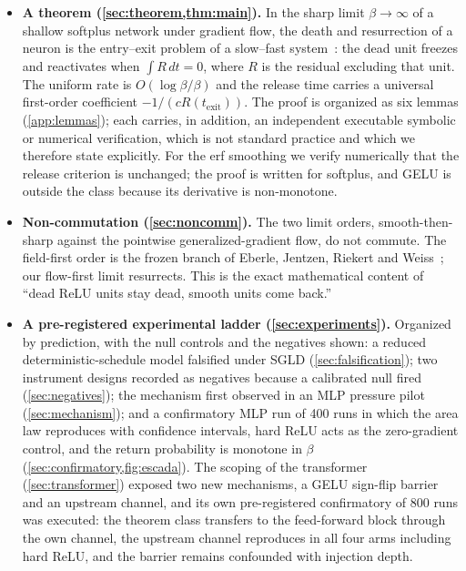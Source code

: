 \documentclass[11pt]{article}
\theoremstyle{definition}
\theoremstyle{remark}
\newcommand{\texit}{t_{\mathrm{exit}}}
\begin{document}
\begin{itemize}
\item \textbf{A theorem (\cref{sec:theorem,thm:main}).} In the sharp limit
$\beta\to\infty$ of a shallow softplus network under gradient flow, the death and
resurrection of a neuron is the entry--exit problem of a slow--fast
system~\cite{DMS16}: the dead unit freezes and reactivates when $\int R\,dt=0$,
where $R$ is the residual excluding that unit. The uniform rate is
$O(\log\beta/\beta)$ and the release time carries a universal first-order
coefficient $-1/(cR(\texit))$. The proof is organized as six lemmas
(\cref{app:lemmas}); each carries, in addition, an independent executable
symbolic or numerical verification, which is not standard practice and which we
therefore state explicitly. For the erf smoothing we verify numerically that the
release criterion is unchanged; the proof is written for softplus, and GELU is
outside the class because its derivative is non-monotone.

\item \textbf{Non-commutation (\cref{sec:noncomm}).} The two limit orders,
smooth-then-sharp against the pointwise generalized-gradient flow, do not
commute. The field-first order is the frozen branch of Eberle, Jentzen, Riekert
and Weiss~\cite{EJRW23}; our flow-first limit resurrects. This is the exact
mathematical content of ``dead ReLU units stay dead, smooth units come back.''

\item \textbf{A pre-registered experimental ladder (\cref{sec:experiments}).}
Organized by prediction, with the null controls and the negatives shown: a
reduced deterministic-schedule model falsified under SGLD
(\cref{sec:falsification}); two instrument designs recorded as negatives because
a calibrated null fired (\cref{sec:negatives}); the mechanism first observed in
an MLP pressure pilot (\cref{sec:mechanism}); and a confirmatory MLP run of 400
runs in which the area law reproduces with confidence intervals, hard ReLU acts
as the zero-gradient control, and the return probability is monotone in $\beta$
(\cref{sec:confirmatory,fig:escada}). The scoping of the transformer
(\cref{sec:transformer}) exposed two new mechanisms, a GELU sign-flip barrier and
an upstream channel, and its own pre-registered confirmatory of 800 runs was
executed: the theorem class transfers to the feed-forward block through the own
channel, the upstream channel reproduces in all four arms including hard ReLU,
and the barrier remains confounded with injection depth.
\end{itemize}
\end{document}
